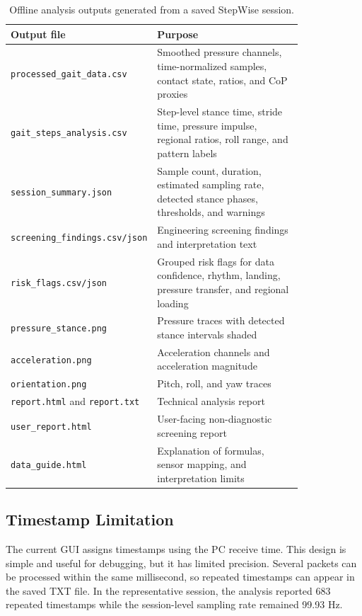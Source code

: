 \begin{table}[h]
\centering
\caption{Offline analysis outputs generated from a saved StepWise session.}
\label{tab:analysis_outputs}
\begin{tabular}{|p{0.30\linewidth}|p{0.52\linewidth}|}
\hline
\textbf{Output file} & \textbf{Purpose} \\
\hline
\texttt{processed\_gait\_data.csv} & Smoothed pressure channels, time-normalized samples, contact state, ratios, and CoP proxies \\
\hline
\texttt{gait\_steps\_analysis.csv} & Step-level stance time, stride time, pressure impulse, regional ratios, roll range, and pattern labels \\
\hline
\texttt{session\_summary.json} & Sample count, duration, estimated sampling rate, detected stance phases, thresholds, and warnings \\
\hline
\texttt{screening\_findings.csv/json} & Engineering screening findings and interpretation text \\
\hline
\texttt{risk\_flags.csv/json} & Grouped risk flags for data confidence, rhythm, landing, pressure transfer, and regional loading \\
\hline
\texttt{pressure\_stance.png} & Pressure traces with detected stance intervals shaded \\
\hline
\texttt{acceleration.png} & Acceleration channels and acceleration magnitude \\
\hline
\texttt{orientation.png} & Pitch, roll, and yaw traces \\
\hline
\texttt{report.html} and \texttt{report.txt} & Technical analysis report \\
\hline
\texttt{user\_report.html} & User-facing non-diagnostic screening report \\
\hline
\texttt{data\_guide.html} & Explanation of formulas, sensor mapping, and interpretation limits \\
\hline
\end{tabular}
\end{table}

\subsection{Timestamp Limitation}
\label{app:timestamp_limitation}

The current GUI assigns timestamps using the PC receive time. This design is simple and useful for debugging, but it has limited precision. Several packets can be processed within the same millisecond, so repeated timestamps can appear in the saved TXT file. In the representative session, the analysis reported 683 repeated timestamps while the session-level sampling rate remained 99.93 Hz.

